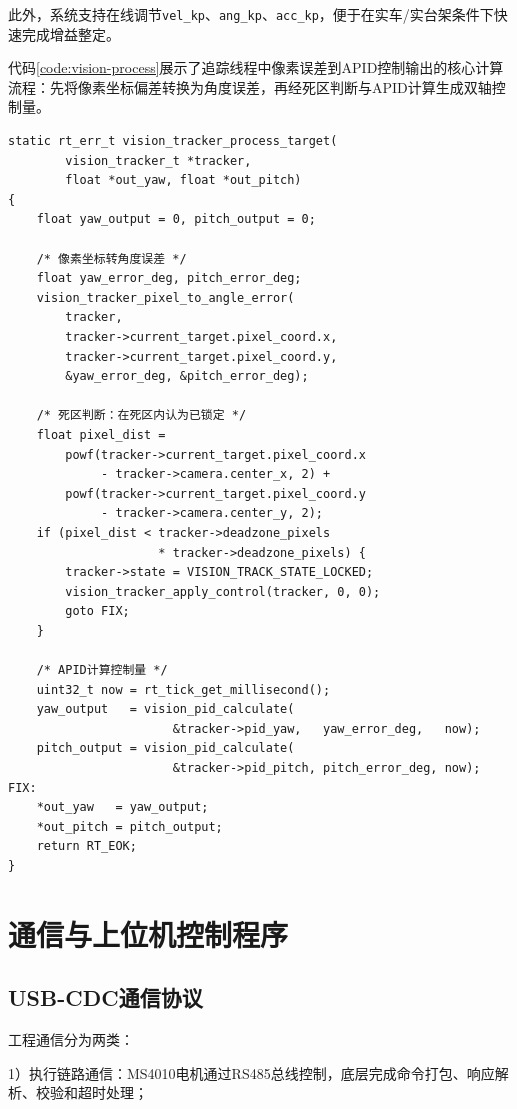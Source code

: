 此外，系统支持在线调节\texttt{vel\_kp}、\texttt{ang\_kp}、\texttt{acc\_kp}，便于在实车/实台架条件下快速完成增益整定。

代码\ref{code:vision-process}展示了追踪线程中像素误差到APID控制输出的核心计算流程：先将像素坐标偏差转换为角度误差，再经死区判断与APID计算生成双轴控制量。

\begin{lstlisting}[style=cstyle, caption={视觉追踪像素误差到APID控制输出（laser\_gimbal\_vision\_tracker.c）}, label=code:vision-process]
static rt_err_t vision_tracker_process_target(
        vision_tracker_t *tracker,
        float *out_yaw, float *out_pitch)
{
    float yaw_output = 0, pitch_output = 0;

    /* 像素坐标转角度误差 */
    float yaw_error_deg, pitch_error_deg;
    vision_tracker_pixel_to_angle_error(
        tracker,
        tracker->current_target.pixel_coord.x,
        tracker->current_target.pixel_coord.y,
        &yaw_error_deg, &pitch_error_deg);

    /* 死区判断：在死区内认为已锁定 */
    float pixel_dist =
        powf(tracker->current_target.pixel_coord.x
             - tracker->camera.center_x, 2) +
        powf(tracker->current_target.pixel_coord.y
             - tracker->camera.center_y, 2);
    if (pixel_dist < tracker->deadzone_pixels
                     * tracker->deadzone_pixels) {
        tracker->state = VISION_TRACK_STATE_LOCKED;
        vision_tracker_apply_control(tracker, 0, 0);
        goto FIX;
    }

    /* APID计算控制量 */
    uint32_t now = rt_tick_get_millisecond();
    yaw_output   = vision_pid_calculate(
                       &tracker->pid_yaw,   yaw_error_deg,   now);
    pitch_output = vision_pid_calculate(
                       &tracker->pid_pitch, pitch_error_deg, now);
FIX:
    *out_yaw   = yaw_output;
    *out_pitch = pitch_output;
    return RT_EOK;
}
\end{lstlisting}

\section{通信与上位机控制程序}

\subsection{USB-CDC通信协议}

工程通信分为两类：

1）执行链路通信：MS4010电机通过RS485总线控制，底层完成命令打包、响应解析、校验和超时处理；

